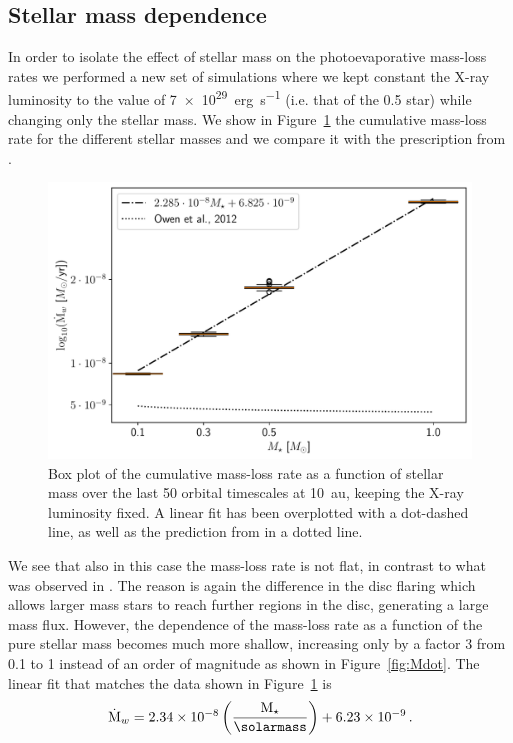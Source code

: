 \documentclass[usenatbib,useAMS,usedcolumn]{mnras}
\begin{document}
\subsection{Stellar mass dependence}\label{sec:mass-dependance}
In order to isolate the effect of stellar mass on the photoevaporative mass-loss rates we performed a new set of simulations where we kept constant the X-ray luminosity to the value of \SI{7e29}{erg.s^{-1}} (i.e. that of the \SI{0.5}{\solarmass} star) while changing only the stellar mass.
We show in Figure~\ref{fig:cumdotMtest} the cumulative mass-loss rate for the different stellar masses and we compare it with the prescription from .
\begin{figure}
  \centering
  \includegraphics[width=\columnwidth]{Figure8}
  \caption{Box plot of the cumulative mass-loss rate as a function of stellar mass over the last 50 orbital timescales at \SI{10}{\astronomicalunit}, keeping the X-ray luminosity fixed. A linear fit has been overplotted with a dot-dashed line, as well as the prediction from  in a dotted line.\label{fig:cumdotMtest}}
\end{figure}
We see that also in this case the mass-loss rate is not flat, in contrast to what was observed in . The reason is again the difference in the disc flaring which allows larger mass stars to reach further regions in the disc, generating a large mass flux. However, the dependence of the mass-loss rate as a function of the pure stellar mass becomes much more shallow, increasing only by a factor $3$ from \SI{0.1}{\solarmass} to \SI{1}{\solarmass} instead of an order of magnitude as shown in Figure~\ref{fig:Mdot}.
The linear fit that matches the data shown in Figure~\ref{fig:cumdotMtest} is
\begin{equation}
    \dot{\mathrm{M}}_w = 2.34 \times 10^{-8} \left(\frac{\mathrm{M}_\star}{\si{\solarmass}}\right) + 6.23 \times 10^{-9}\,.
\end{equation}
\end{document}
